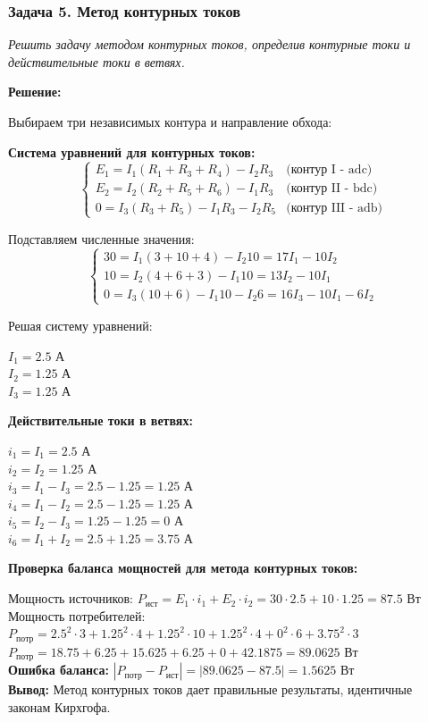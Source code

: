 \subsubsection{Задача 5. Метод контурных токов}
\textit{Решить задачу методом контурных токов, определив контурные токи и действительные токи в ветвях.}

\textbf{Решение:}

Выбираем три независимых контура и направление обхода:

\textbf{Система уравнений для контурных токов:}
$$\begin{cases}
E_1 = I_1 (R_1 + R_3 + R_4) - I_2R_3 & \text{(контур I - adc)} \\
E_2 = I_2 (R_2 + R_5 + R_6) - I_1R_3 & \text{(контур II - bdc)} \\
0 = I_3 (R_3 + R_5) - I_1R_3 - I_2R_5 & \text{(контур III - adb)}
\end{cases}$$

Подставляем численные значения:
$$\begin{cases}
30 = I_1 (3 + 10 + 4) - I_2 10 = 17I_1 - 10I_2 \\
10 = I_2 (4 + 6 + 3) - I_1 10 = 13I_2 - 10I_1 \\
0 = I_3 (10 + 6) - I_1 10 - I_2 6 = 16I_3 - 10I_1 - 6I_2
\end{cases}$$

Решая систему уравнений:
\begin{flushleft}
$I_1 = 2.5$ А \\
$I_2 = 1.25$ А \\
$I_3 = 1.25$ А
\end{flushleft}

\textbf{Действительные токи в ветвях:}
\begin{flushleft}
$i_1 = I_1 = 2.5$ А \\
$i_2 = I_2 = 1.25$ А \\
$i_3 = I_1 - I_3 = 2.5 - 1.25 = 1.25$ А \\
$i_4 = I_1 - I_2 = 2.5 - 1.25 = 1.25$ А \\
$i_5 = I_2 - I_3 = 1.25 - 1.25 = 0$ А \\
$i_6 = I_1 + I_2 = 2.5 + 1.25 = 3.75$ А
\end{flushleft}

\textbf{Проверка баланса мощностей для метода контурных токов:}
\begin{flushleft}
Мощность источников: $P_{ист} = E_1 \cdot i_1 + E_2 \cdot i_2 = 30 \cdot 2.5 + 10 \cdot 1.25 = 87.5$ Вт \\
Мощность потребителей: $P_{потр} = 2.5^2 \cdot 3 + 1.25^2 \cdot 4 + 1.25^2 \cdot 10 + 1.25^2 \cdot 4 + 0^2 \cdot 6 + 3.75^2 \cdot 3$ \\
$P_{потр} = 18.75 + 6.25 + 15.625 + 6.25 + 0 + 42.1875 = 89.0625$ Вт \\
\textbf{Ошибка баланса:} $|P_{потр} - P_{ист}| = |89.0625 - 87.5| = 1.5625$ Вт \\
\textbf{Вывод:} Метод контурных токов дает правильные результаты, идентичные законам Кирхгофа.
\end{flushleft}

